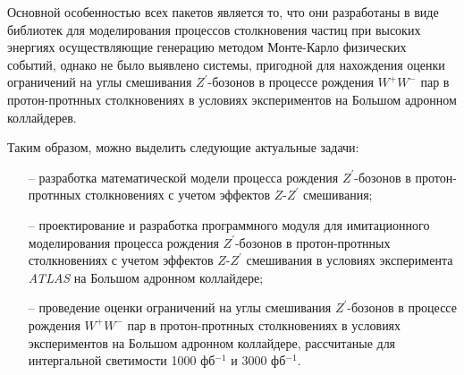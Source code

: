 Основной особенностью всех пакетов является то, что они разработаны в виде библиотек для моделирования процессов столкновения частиц при высоких энергиях осуществляющие генерацию методом Монте-Карло физических событий, однако не было выявлено системы, пригодной для нахождения оценки ограничений на углы смешивания ${Z}^{\prime}$-бозонов в процессе рождения ${W}^{+}$${W}^{-}$ пар в протон-протнных столкновениях в условиях экспериментов на Большом адронном коллайдерев.

Таким образом, можно выделить следующие актуальные задачи:
\begin{itemize}
	\item[--] разработка математической модели процесса рождения ${Z}^{\prime}$-бозонов в протон-протнных столкновениях с учетом эффектов $Z$-${Z}^{\prime}$ смешивания;
	
	\item[--] проектирование и разработка программного модуля для имитационного моделирования процесса
	рождения ${Z}^{\prime}$-бозонов в протон-протнных столкновениях с учетом эффектов $Z$-${Z}^{\prime}$ смешивания в условиях эксперимента \textit{ATLAS} на Большом адронном коллайдере;
	
	\item[--] проведение оценки ограничений на углы смешивания ${Z}^{\prime}$-бозонов в процессе рождения ${W}^{+}$${W}^{-}$ пар в протон-протнных столкновениях
	в условиях экспериментов на Большом адронном коллайдере, рассчитаные для интергальной светимости 1000 фб${}^{−1}$ и 3000 фб${}^{−1}$.
	
\end{itemize}